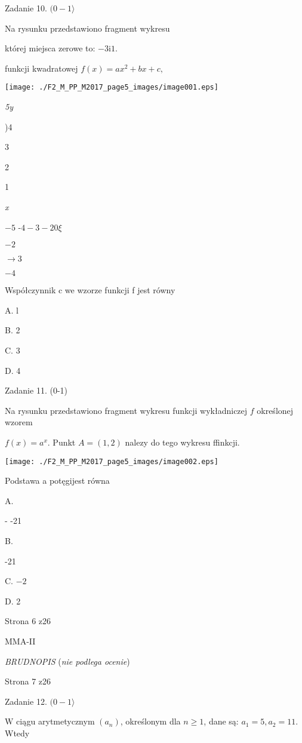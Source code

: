\documentclass[a4paper,12pt]{article}
\begin{document}
Zadanie 10. $(0-1\rangle$

Na rysunku przedstawiono fragment wykresu

której miejsca zerowe to: $-3 \mathrm{i}1.$

funkcji kwadratowej $f(x)=ax^{2}+bx+c,$
\begin{center}
\texttt{[image: ./F2\_M\_PP\_M2017\_page5\_images/image001.eps]}
\end{center}
{\it 5y}

)4

3

2

1

{\it x}

$-5$ -$4  -3 -2  0 \xi$

$-2$

$\rightarrow 3$

$-4$

Współczynnik c we wzorze funkcji f jest równy

A. l

B. 2

C. 3

D. 4

Zadanie 11. (0-1)

Na rysunku przedstawiono fragment wykresu funkcji wykładniczej $f$ określonej wzorem

$f(x)=a^{x}$. Punkt $A=(1,2)$ nalezy do tego wykresu ffinkcji.
\begin{center}
\texttt{[image: ./F2\_M\_PP\_M2017\_page5\_images/image002.eps]}
\end{center}
Podstawa a potęgijest równa

A.

- -21

B.

-21

C. $-2$

D. 2

Strona 6 z26

MMA-II





{\it BRUDNOPIS} ({\it nie podlega ocenie})

Strona 7 z26





Zadanie 12. $(0-1\rangle$

$\mathrm{W}$ ciągu arytmetycznym $(a_{n})$, określonym dla $n\geq 1$, dane są: $a_{1}=5, a_{2}=11$. Wtedy
\end{document}
